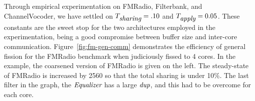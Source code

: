 Through empirical experimentation on FMRadio, Filterbank, and
ChannelVocoder, we have settled on $T_{\mbox{\it sharing}} =.10$ and
$T_{\mbox{\it apply}} = 0.05$. These constants are the sweet stop for the two
architectures employed in the experimentation, being a good compromise
between buffer size and inter-core communication.
Figure~\ref{fig:fm-gen-comm} demonstrates the efficiency of general
fission for the FMRadio benchmark when judiciously fissed to 4 cores.
In the example, the coarsened version of FMRadio is given on the left.
The steady-state of FMRadio is increased by 2560 so that the total
sharing is under 10\%.  The last filter in the graph, the
$\mbox{\it Equalizer}$ has a large $\mbox{\it dup}$, and this had to be overcome
for each core.

